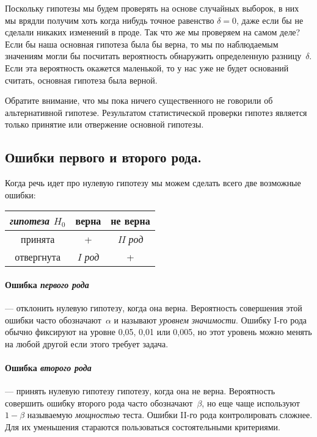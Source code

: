 \documentclass[../handbook.tex]{subfiles}
\begin{document}
Поскольку гипотезы мы будем проверять на основе случайных выборок, в них мы
врядли получим хоть когда нибудь точное равенство $\delta = 0$, даже если бы
не сделали никаких изменений в проде. Так что же мы проверяем на самом деле?
Если бы наша основная гипотеза была бы верна, то мы по наблюдаемым значениям
могли бы посчитать вероятность обнаружить определенную разницу~$\delta$. Если
эта вероятность окажется маленькой, то у нас уже не будет оснований считать,
основная гипотеза была верной.

Обратите внимание, что мы пока ничего существенного не говорили об
альтернативной гипотезе. Результатом статистической проверки гипотез является
только принятие или отвержение основной гипотезы.

\subsection{Ошибки первого и второго рода.} 
Когда речь идет про нулевую гипотезу мы можем сделать всего две возможные
ошибки:
\begin{margintable}
    \label{tab:mistakes}
    \begin{center}
        \begin{tabular}[c]{c|c c}
            {\it гипотеза $H_0$} & верна & не верна \\
            \hline
            принята & + & {\it II род} \\
            отвергнута & {\it I род} & + \\
        \end{tabular}
    \end{center}
\end{margintable}
        
\paragraph{Ошибка \emph{первого рода}} --- отклонить нулевую гипотезу, когда
она верна. Вероятность совершения этой ошибки часто обозначают~$\alpha$ и
называют \emph{уровнем значимости}. Ошибку I-го рода обычно фиксируют на уровне
0,05, 0,01 или 0,005, но этот уровень можно менять на любой другой если этого
требует задача.

\paragraph{Ошибка \emph{второго рода}}
--- принять нулевую гипотезу гипотезу,
когда она не верна. Вероятность совершить ошибку второго рода часто
обозначают~$\beta$, но еще чаще используют $1 - \beta$ называемую
\emph{мощностью} теста. Ошибки II-го рода контролировать сложнее. Для их
уменьшения стараются пользоваться состоятельными критериями.
\end{document}
